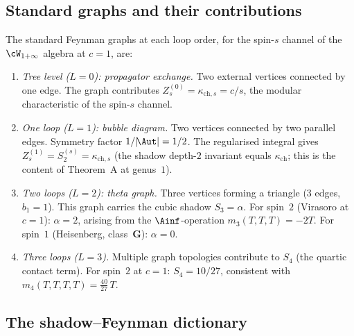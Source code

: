 \subsection{Standard graphs and their contributions}
\label{subsec:standard-graphs}

The standard Feynman graphs at each loop order, for the spin-$s$ channel of the $\cW_{1+\infty}$ algebra at $c = 1$, are:

\begin{enumerate}[label=\textup{(\roman*)}]
 \item \emph{Tree level ($L = 0$): propagator exchange.} Two external vertices connected by one edge. The graph contributes $Z^{(0)}_s = \kappa_{\mathrm{ch},s} = c/s$, the modular characteristic of the spin-$s$ channel.

 \item \emph{One loop ($L = 1$): bubble diagram.} Two vertices connected by two parallel edges. Symmetry factor $1/|\!\Aut| = 1/2$. The regularised integral gives $Z^{(1)}_s = S_2^{(s)} = \kappa_{\mathrm{ch},s}$ (the shadow depth-$2$ invariant equals $\kappa_{\mathrm{ch}}$; this is the content of Theorem~A at genus~$1$).

 \item \emph{Two loops ($L = 2$): theta graph.} Three vertices forming a triangle ($3$ edges, $b_1 = 1$). This graph carries the cubic shadow $S_3 = \alpha$. For spin~$2$ (Virasoro at $c = 1$): $\alpha = 2$, arising from the $\Ainf$-operation $m_3(T, T, T) = -2T$. For spin~$1$ (Heisenberg, class~$\mathbf{G}$): $\alpha = 0$.

 \item \emph{Three loops ($L = 3$).} Multiple graph topologies contribute to $S_4$ (the quartic contact term). For spin~$2$ at $c = 1$: $S_4 = 10/27$, consistent with $m_4(T, T, T, T) = \tfrac{40}{27}\, T$.
\end{enumerate}

\subsection{The shadow--Feynman dictionary}
\label{subsec:shadow-feynman-dictionary}

